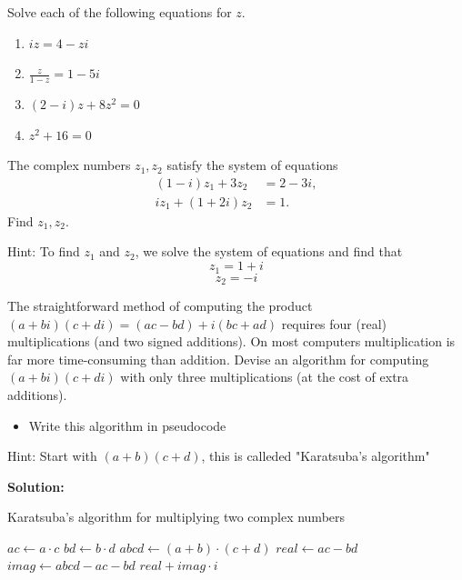\documentclass[
	12pt, %
	fleqn, %
	a4paper, %
]{LegrandOrangeBook}
\begin{document}
\begin{exercise}
    Solve each of the following equations for \( z \).
    \begin{enumerate}[label=(\alph*)]
        \item \( iz = 4 - zi \)
        \item \( \frac{z}{1 - z} = 1 - 5i \)
        \item \( (2 - i)z + 8z^2 = 0 \)
        \item \( z^2 + 16 = 0 \)
    \end{enumerate}
\end{exercise}


\begin{exercise}
    The complex numbers \( z_1, z_2 \) satisfy the system of equations
\begin{align*}
    (1 - i)z_1 + 3z_2 &= 2 - 3i, \\
    iz_1 + (1 + 2i)z_2 &= 1.
\end{align*}
Find \( z_1, z_2 \).
\end{exercise}
Hint: To find \( z_1 \) and \( z_2 \), we solve the system of equations and find that
\[ z_1 = 1 + i \]
\[ z_2 = -i \]

\begin{exercise}
    The straightforward method of computing the product \((a + bi)(c + di) = (ac - bd) + i(bc + ad)\) requires four (real) multiplications (and two signed additions). On most computers multiplication is far more time-consuming than addition. Devise an algorithm for computing \((a + bi)(c + di)\) with only three multiplications (at the cost of extra additions). 
    \begin{itemize}
        \item Write this algorithm in pseudocode
    \end{itemize}
\end{exercise}

\noindent Hint: Start with \((a + b)(c + d)\), this is calleded "Karatsuba's algorithm"

\noindent \textbf{Solution:}
\begin{algorithm}
    \caption{Karatsuba's algorithm for multiplying two complex numbers}
    \begin{algorithmic}[1]
    \State $ac \gets a \cdot c$
    \State $bd \gets b \cdot d$
    \State $abcd \gets (a + b) \cdot (c + d)$
    \State $real \gets ac - bd$
    \State $imag \gets abcd - ac - bd$
    \State \Return $real + imag \cdot i$
    \EndProcedure
    \end{algorithmic}
    \end{algorithm}
\end{document}
